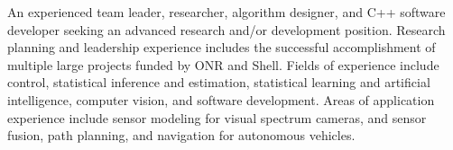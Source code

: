 An experienced team leader, researcher, algorithm designer, and C++ software developer seeking an advanced research and/or development position. Research planning and leadership experience includes the successful accomplishment of multiple large projects funded by ONR and Shell. Fields of experience include control, statistical inference and estimation, statistical learning and artificial intelligence, computer vision, and software development. Areas of application experience include sensor modeling for visual spectrum cameras, and sensor fusion, path planning, and navigation for autonomous vehicles.
